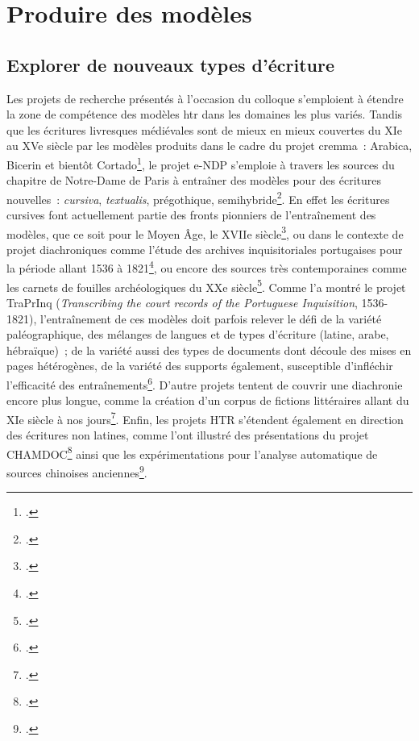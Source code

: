 \documentclass[a4paper,12pt,twoside]{book}
\begin{document}
		\section{Produire des modèles}
		
			\subsection{Explorer de nouveaux types d'écriture}
			
				Les projets de recherche présentés à l'occasion du colloque s'emploient
				à étendre la zone de compétence des modèles \gls{htr} dans les domaines les
				plus variés. Tandis que les écritures livresques médiévales sont de
				mieux en mieux couvertes du XIe au XVe siècle par les modèles produits
				dans le cadre du projet \gls{cremma}~: Arabica, Bicerin et bientôt Cortado\footcite{campsCremmaLabProjectsTranscription2022}, le projet e-NDP
				s'emploie à travers les sources du chapitre de Notre-Dame de Paris à
				entraîner des modèles pour des écritures nouvelles~: \textit{cursiva},
				\textit{textualis}, prégothique, semihybride\footcite{torresaguilarModelisationAffinageHTR2022}. En effet les écritures
				cursives font actuellement partie des fronts pionniers de l'entraînement
				des modèles, que ce soit pour le Moyen Âge, le XVIIe siècle\footcite{paupeCursiveXVIIeSiecle2022}, ou dans le contexte de projet
				diachroniques comme l'étude des archives inquisitoriales portugaises
				pour la période allant 1536 à 1821\footcite{baudryArchivesInquisitorialesPortugal2022}, ou encore des sources
				très contemporaines comme les carnets de fouilles archéologiques du XXe
				siècle\footcite{tufferyRetourExperiencesUtilisation2022}. Comme l'a montré
				le projet TraPrInq (\textit{Transcribing the court records of the
					Portuguese Inquisition}, 1536-1821), l'entraînement de ces modèles doit
				parfois relever le défi de la variété paléographique, des mélanges de
				langues et de types d'écriture (latine, arabe, hébraïque)~; de la
				variété aussi des types de documents dont découle des mises en pages
				hétérogènes, de la variété des supports également, susceptible
				d'infléchir l'efficacité des entraînements\footcite{baudryArchivesInquisitorialesPortugal2022}. D'autre projets
				tentent de couvrir une diachronie encore plus longue, comme la création
				d'un corpus de fictions littéraires allant du XIe siècle à nos jours\footcite{campsCremmaLabProjectsTranscription2022}. Enfin, les projets HTR
				s'étendent également en direction des écritures non latines, comme l'ont
				illustré des présentations du projet CHAMDOC\footcite{schweyerAnalyseReconnaissanceIndexation2022} ainsi que les
				expérimentations pour l'analyse automatique de sources chinoises
				anciennes\footcite{bizais-lilligExperimentationsPourAnalyse2022}.
			
\end{document}
